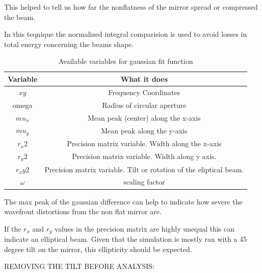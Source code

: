 \documentclass[twoside]{article}
\begin{document}
This helped to tell us how far the nonflatness of the mirror spread or compressed the beam.

In this teqnique the normalized integral comparision is used to avoid losses in total energy concerning the beams shape. 

\begin{table}[H]
    \begin{center}
        \begin{tabular}{|c|c|}
        \hline
        Variable & What it does\\
        \hline\hline
            $xy$ & Frequency Coordinates\\
            omega & Radius of circular aperture \\
            $mu_x$ & Mean peak (center) along the x-axis \\
            $mu_y$ & Mean peak along the y-axis\\
            $r_x2$ & Precision matrix variable. Width along the x-axis \\
            $r_y2$ & Precision matrix variable. Width along y axis.\\
            $r_xy2$ &  Precision matrix variable. Tilt or rotation of the eliptical beam. \\
            $\omega$ &  scaling factor \\
        \hline
        \end{tabular}
    \end{center}
    \caption{Available variables for gaussian fit function}
\end{table}

The max peak of the gaussian difference can help to indicate how severe the wavefront distortions from the non flat mirror are. 

If the $r_x$ and $r_y$ values in the precision matrix are highly unequal this can indicate an elliptical beam. Given that the simulation is mostly ran with a 45 degree tilt on the mirror, this ellipticity should be expected. 

REMOVING THE TILT BEFORE ANALYSIS:

\end{document}
